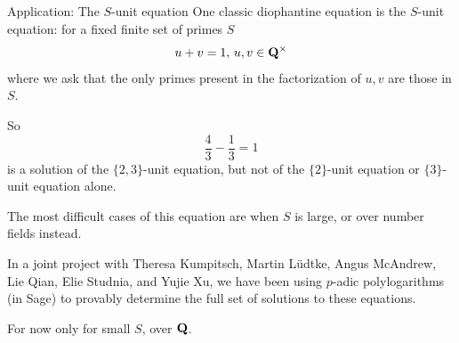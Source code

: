 \begin{frame}{Application: The $S$-unit equation}
    One classic diophantine equation is the $S$-unit equation: for a fixed finite set of primes $S$
    \[u + v = 1,\,u,v\in \mathbf Q^\times\]
    where we ask that the only primes present in the factorization of $u,v$ are those in $S$.

    So
    \[\frac 43 - \frac13 = 1\]
    is a solution of the $\{2,3\}$-unit equation, but not of the $\{2\}$-unit equation or $\{3\}$-unit equation alone.

    The most difficult cases of this equation are when $S$ is large, or over number fields instead.
\end{frame}

\begin{frame}
    In a joint project with Theresa Kumpitsch,  Martin L\"udtke,  Angus McAndrew,  Lie Qian,  Elie Studnia, and Yujie Xu, we have been using $p$-adic polylogarithms (in Sage) to provably determine the full set of solutions to these equations.

    For now only for small $S$, over $\mathbf Q$.
\end{frame}

